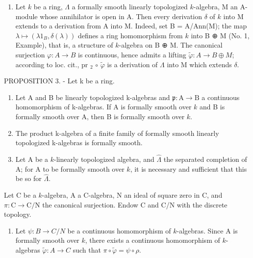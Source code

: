 \begin{enumerate}
\def\labelenumi{\arabic{enumi})}
\setcounter{enumi}{1}
\tightlist
\item
  Let \(k\) be a ring, \(\Lambda\) a formally smooth linearly topologized \(k\)-algebra, M an A-module whose annihilator is open in A. Then every derivation \(\delta\) of \(k\) into M extends to a derivation from A into M. Indeed, set B = A/Ann(M); the map \(\lambda \mapsto (\lambda 1_{B}, \delta(\lambda))\) defines a ring homomorphism from \(k\) into B ⊕ M (No. 1, Example), that is, a structure of \(k\)-algebra on B ⊕ M. The canonical surjection \(\varphi: A \to B\) is continuous, hence admits a lifting \(\tilde{\varphi}: A \to B \oplus M\); according to loc. cit., pr \(_{2}\) \(\circ\) \(\tilde{\varphi}\) is a derivation of \(\Lambda\) into M which extends \(\delta\).
\end{enumerate}

PROPOSITION 3. - Let k be a ring.

\begin{enumerate}
\def\labelenumi{\alph{enumi})}
\item
  Let A and B be linearly topologized k-algebras and \(\mathfrak{p}: \mathrm{A} \to \mathrm{B}\) a continuous homomorphism of k-algebras. If A is formally smooth over \(k\) and B is formally smooth over A, then B is formally smooth over \(k\).
\item
  The product k-algebra of a finite family of formally smooth linearly topologized k-algebras is formally smooth.
\item
  Let A be a \(k\)-linearly topologized algebra, and \(\hat{\Lambda}\) the separated completion of A; for A to be formally smooth over \(k\), it is necessary and sufficient that this be so for \(\hat{\Lambda}\).
\end{enumerate}

Let C be a \(k\)-algebra, A a C-algebra, N an ideal of square zero in C, and \(\pi : \mathrm{C} \to \mathrm{C/N}\) the canonical surjection. Endow C and C/N with the discrete topology.

\begin{enumerate}
\def\labelenumi{\alph{enumi})}
\tightlist
\item
  Let \(\psi : B \to C/N\) be a continuous homomorphism of \(k\)-algebras. Since A is formally smooth over \(k\), there exists a continuous homomorphism of \(k\)-algebras \(\tilde{\varphi} : A \to C\) such that \(\pi \circ \tilde{\varphi} = \psi \circ \rho\).
\end{enumerate}

